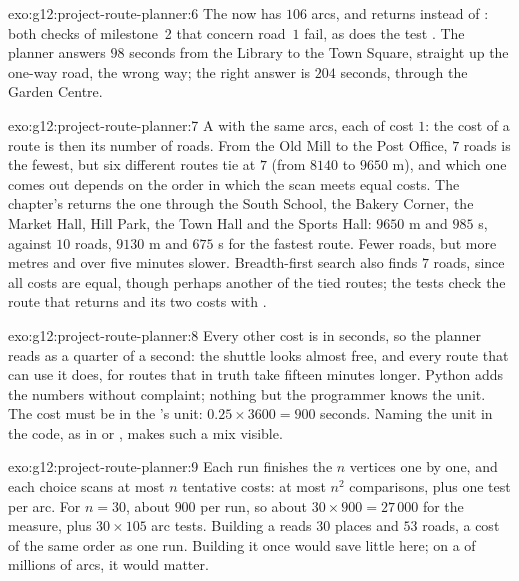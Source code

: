 \begin{solution}{exo:g12:project-route-planner:6}
The  now has $106$ arcs, and  returns \code{[]} instead of \code{[(1, 3)]}: both checks of
milestone~2 that concern road~$1$ fail, as does the test . The planner answers $98$ seconds
from the Library to the Town Square, straight up the one-way road, the wrong way; the right answer is $204$ seconds,
through the Garden Centre.
\end{solution}

\begin{solution}{exo:g12:project-route-planner:7}
A  with the same arcs, each of cost $1$: the cost of a route is then its number of roads. From the Old Mill to
the Post Office, $7$ roads is the fewest, but six different routes tie at $7$ (from $8140$ to $9650$ m), and which one
comes out depends on the order in which the scan meets equal costs. The chapter's  returns the one
through the South School, the Bakery Corner, the Market Hall, Hill Park, the Town Hall and the Sports Hall: $9650$ m
and $985$ s, against $10$ roads, $9130$ m and $675$ s for the fastest route. Fewer roads, but more metres and over five
minutes slower. Breadth-first search also finds $7$ roads, since all costs are equal, though perhaps another of the
tied routes; the tests check the route that  returns and its two costs with .
\end{solution}

\begin{solution}{exo:g12:project-route-planner:8}
Every other cost is in seconds, so the planner reads  as a quarter of a second: the shuttle looks almost
free, and every route that can use it does, for routes that in truth take fifteen minutes longer. Python adds the
numbers without complaint; nothing but the programmer knows the unit. The cost must be in the 's unit:
$0.25 \times 3600 = 900$ seconds. Naming the unit in the code, as in  or , makes
such a mix visible.
\end{solution}

\begin{solution}{exo:g12:project-route-planner:9}
Each run finishes the $n$ vertices one by one, and each choice scans at most $n$ tentative costs: at most $n^2$
comparisons, plus one test per arc. For $n = 30$, about $900$ per run, so about $30 \times 900 = 27\,000$ for the
measure, plus $30 \times 105$ arc tests. Building a  reads $30$ places
and $53$ roads, a cost of the same order as one run. Building it once would save little here; on a  of millions
of arcs, it would matter.
\end{solution}

